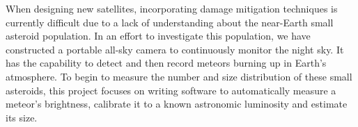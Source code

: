 When  designing new satellites, incorporating damage mitigation techniques is currently difficult due to a lack of understanding about the near-Earth small asteroid population. In an effort to investigate this population, we have constructed a portable all-sky camera to continuously monitor the night sky. It has the capability to detect and then record meteors burning up in Earth's atmosphere. To begin to measure the number and size distribution of these small asteroids, this project focuses on writing software to automatically measure a meteor's brightness, calibrate it to a known astronomic luminosity and estimate its size.
